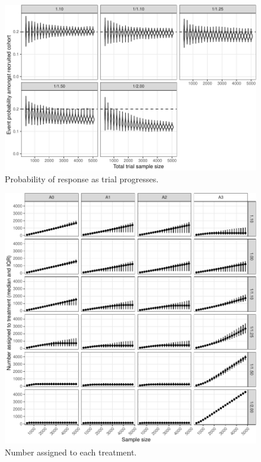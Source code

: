 \documentclass[
]{article}
\begin{document}
\begin{figure}
\centering
\includegraphics{ASCOT_simulations_5_files/figure-latex/fig7-1.pdf}
\caption{\label{fig:fig7}Probability of response as trial progresses.}
\end{figure}

\begin{figure}
\centering
\includegraphics{ASCOT_simulations_5_files/figure-latex/unnamed-chunk-5-1.pdf}
\caption{\label{fig:unnamed-chunk-5}Number assigned to each treatment.}
\end{figure}
\end{document}
